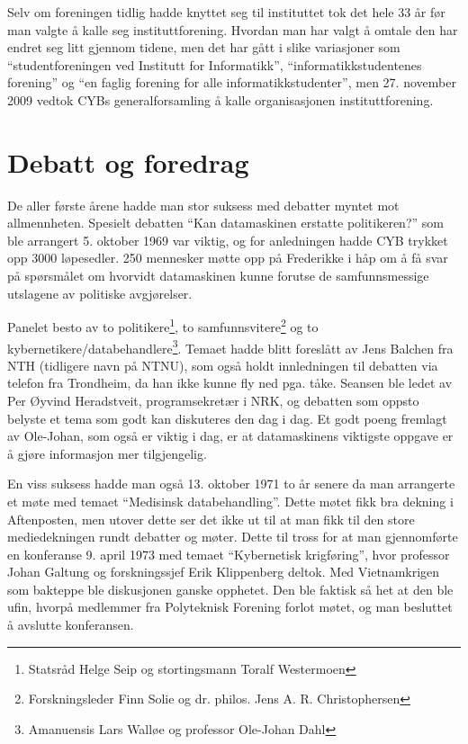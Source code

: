 Selv om foreningen tidlig hadde knyttet seg til instituttet tok det hele 33 år før man valgte å kalle seg instituttforening. Hvordan man har valgt å omtale den har endret seg litt gjennom tidene, men det har gått i slike variasjoner som ``studentforeningen ved Institutt for Informatikk'', ``informatikkstudentenes forening'' og ``en faglig forening for alle informatikkstudenter'', men 27. november 2009 vedtok CYBs generalforsamling å kalle organisasjonen instituttforening.

\section{Debatt og foredrag}

De aller første årene hadde man stor suksess med debatter myntet mot allmennheten. Spesielt debatten ``Kan datamaskinen erstatte politikeren?'' som ble arrangert 5. oktober 1969 var viktig, og for anledningen hadde CYB trykket opp 3000 løpesedler. 250 mennesker møtte opp på Frederikke i håp om å få svar på spørsmålet om hvorvidt datamaskinen kunne forutse de samfunnsmessige utslagene av politiske avgjørelser. 

Panelet besto av to politikere\footnote{Statsråd Helge Seip og stortingsmann Toralf Westermoen}, to samfunnsvitere\footnote{Forskningsleder Finn Solie og dr. philos. Jens A. R. Christophersen} og to kybernetikere\slash databehandlere\footnote{Amanuensis Lars Walløe og professor Ole-Johan Dahl}. Temaet hadde blitt foreslått av Jens Balchen fra NTH (tidligere navn på NTNU), som også holdt innledningen til debatten via telefon fra Trondheim, da han ikke kunne fly ned pga. tåke. Seansen ble ledet av Per Øyvind Heradstveit, programsekretær i NRK, og debatten som oppsto belyste et tema som godt kan diskuteres den dag i dag. Et godt poeng fremlagt av Ole-Johan, som også er viktig i dag, er at datamaskinens viktigste oppgave er å gjøre informasjon mer tilgjengelig.

En viss suksess hadde man også 13. oktober 1971 to år senere da man arrangerte et møte med temaet ``Medisinsk databehandling''. Dette møtet fikk bra dekning i Aftenposten, men utover dette ser det ikke ut til at man fikk til den store mediedekningen rundt debatter og møter. Dette til tross for at man gjennomførte en konferanse 9. april 1973 med temaet ``Kybernetisk krigføring'', hvor professor Johan Galtung og forskningssjef Erik Klippenberg deltok. Med Vietnamkrigen som bakteppe ble diskusjonen ganske opphetet. Den ble faktisk så het at den ble ufin, hvorpå medlemmer fra Polyteknisk Forening forlot møtet, og man besluttet å avslutte konferansen.

